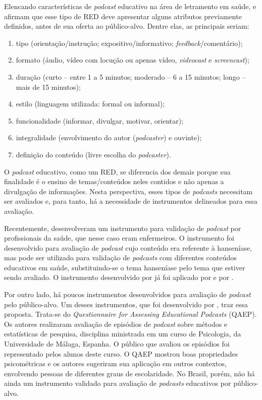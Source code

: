 Elencando características de \textit{podcast} educativo na área de letramento em saúde, \textcite{lopes2015} e \textcite{sampaio2021} afirmam que esse tipo de RED deve apresentar alguns atributos previamente definidos, antes de sua oferta ao público-alvo. Dentre elas, as principais seriam: 
\begin{enumerate}%
	\item tipo (orientação/instrução; expositivo/informativo; \textit{feedback}/comentário);
	\item formato (áudio, vídeo com locução ou apenas vídeo, \textit{videocast} e \textit{screencast});
	\item duração (curto – entre 1 a 5 minutos; moderado – 6 a 15 minutos; longo – mais de 15 minutos);
	\item estilo (linguagem utilizada: formal ou informal);
	\item funcionalidade (informar, divulgar, motivar, orientar);
	\item integralidade (envolvimento do autor (\textit{podcaster}) e ouvinte);
	\item definição do conteúdo (livre escolha do \textit{podcaster}).
\end{enumerate}

O \textit{podcast} educativo, como um RED, se diferencia dos demais porque sua finalidade é o ensino de temas/conteúdos neles contidos e não apenas a divulgação de informações. Nesta perspectiva, esses tipos de \textit{podcasts} necessitam ser avaliados e, para tanto, há a necessidade de instrumentos delineados para essa avaliação.

Recentemente, \textcite{muniz2021} desenvolveram um instrumento para validação de \textit{podcast} por profissionais da saúde, que nesse caso eram enfermeiros. O instrumento foi desenvolvido para avaliação de \textit{podcast} cujo conteúdo era referente à hanseníase, mas pode ser utilizado para validação de \textit{podcasts} com diferentes conteúdos educativos em saúde, substituindo-se o tema hanseníase pelo tema que estiver sendo avaliado. O instrumento desenvolvido por \textcite{muniz2021} já foi aplicado por \textcite{mota2021} e por \textcite{leite2022}.

Por outro lado, há poucos instrumentos desenvolvidos para avaliação de \textit{podcast} pelo público-alvo. Um desses instrumentos, que foi desenvolvido por \textcite{alarcon2020}, traz essa proposta. Trata-se do \textit{Questionnaire for Assessing Educational Podcasts} (QAEP). Os autores realizaram avaliação de episódios de \textit{podcast} sobre métodos e estatísticas de pesquisa, disciplina ministrada em um curso de Psicologia, da Universidade de Málaga, Espanha. O público que avaliou os episódios foi representado pelos alunos deste curso. O QAEP mostrou boas propriedades psicométricas e os autores sugeriram sua aplicação em outros contextos, envolvendo pessoas de diferentes graus de escolaridade. No Brasil, porém, não há ainda um instrumento validado para avaliação de \textit{podcasts} educativos por público-alvo.

